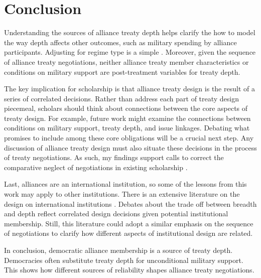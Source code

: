 \documentclass[12pt]{article}
\begin{document}
\section{Conclusion}


Understanding the sources of alliance treaty depth helps clarify the how to model the way depth affects other outcomes, such as military spending by alliance participants. 
Adjusting for regime type is a simple . 
Moreover, given the sequence of alliance treaty negotiations, neither alliance treaty member characteristics or conditions on military support are post-treatment variables for treaty depth. 


The key implication for scholarship is that alliance treaty design is the result of a series of correlated decisions. 
Rather than address each part of treaty design piecemeal, scholars should think about connections between the core aspects of treaty design. 
For example, future work might examine the connections between conditions on military support, treaty depth, and issue linkages.  
Debating what promises to include among these core obligations will be a crucial next step. 
Any discussion of alliance treaty design must also situate these decisions in the process of treaty negotiations.
As such, my findings support calls to correct the comparative neglect of negotiations in existing scholarship \citep{Poast2019a}. 


Last, alliances are an international institution, so some of the lessons from this work may apply to other institutions. 
There is an extensive literature on the design on international institutions \citep{DownesRocke1995, MartinSimmons1998, Koremenosetal2001, Koremenos2005, Thompson2010}.
Debates about the trade off between breadth and depth \citep{Downsetal1998, Gilligan2004} reflect correlated design decisions given potential institutional membership. 
Still, this literature could adopt a similar emphasis on the sequence of negotiations to clarify how different aspects of institutional design are related. 


In conclusion, democratic alliance membership is a source of treaty depth. 
Democracies often substitute treaty depth for unconditional military support. 
This shows how different sources of reliability shapes alliance treaty negotiations. 



\singlespace
 
 
\end{document}

